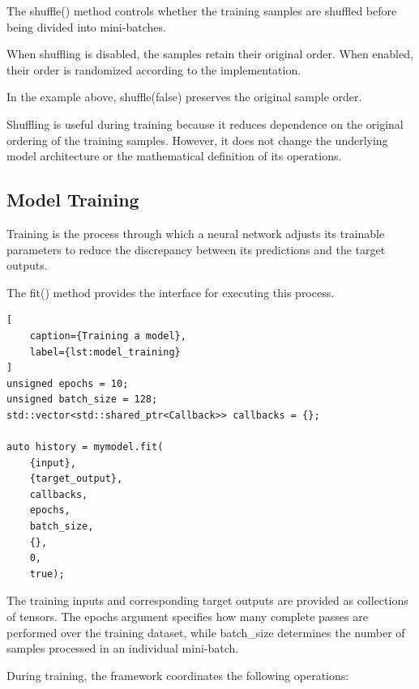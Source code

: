 The shuffle() method controls whether the training samples
are shuffled before being divided into mini-batches.

When shuffling is disabled, the samples retain their original
order. When enabled, their order is randomized according to
the implementation.

In the example above, shuffle(false) preserves the original
sample order.

Shuffling is useful during training because it reduces
dependence on the original ordering of the training samples.
However, it does not change the underlying model architecture
or the mathematical definition of its operations.


\subsection{Model Training}

Training is the process through which a neural network
adjusts its trainable parameters to reduce the discrepancy
between its predictions and the target outputs.

The fit() method provides the interface for executing this
process.

\begin{lstlisting}[
    caption={Training a model},
    label={lst:model_training}
]
unsigned epochs = 10;
unsigned batch_size = 128;
std::vector<std::shared_ptr<Callback>> callbacks = {};

auto history = mymodel.fit(
    {input},
    {target_output},
    callbacks,
    epochs,
    batch_size,
    {},
    0,
    true);
\end{lstlisting}

The training inputs and corresponding target outputs are
provided as collections of tensors. The epochs argument
specifies how many complete passes are performed over the
training dataset, while batch\_size determines the number
of samples processed in an individual mini-batch.

During training, the framework coordinates the following
operations:

